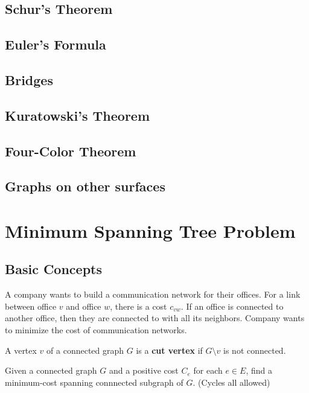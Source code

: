 		\section{Schur's Theorem}

		\section{Euler's Formula}

		\section{Bridges}

		\section{Kuratowski's Theorem}

		\section{Four-Color Theorem}

		\section{Graphs on other surfaces}

	\chapter{Minimum Spanning Tree Problem}
		\section{Basic Concepts}
			\begin{example}
				A company wants to build a communication network for their offices. For a link between office $v$ and office $w$, there is a cost $c_{vw}$. If an office is connected to another office, then they are connected to with all its neighbors. Company wants to minimize the cost of communication networks.
			\end{example}

			\begin{definition}
				A vertex $v$ of a connected graph $G$ is a \textbf{cut vertex} if $G\setminus v$ is not connected.
			\end{definition}

			\begin{definition}
				Given a connected graph $G$ and a positive cost $C_e$ for each $e\in E$, find a minimum-cost spanning connnected subgraph of $G$. (Cycles all allowed)
			\end{definition}

